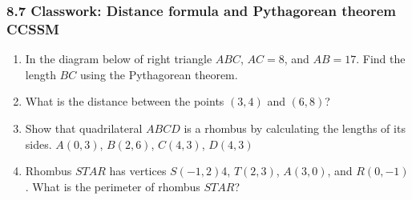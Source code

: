 

\fancyhead[LE]{\thepage}



\subsubsection*{8.7 Classwork: Distance formula and Pythagorean theorem \hfill CCSSM}
\begin{enumerate}
\item In the diagram below of right triangle $ABC$, $AC=8$, and $AB=17$. Find the length $BC$ using the Pythagorean theorem.
\begin{flushright}
\end{flushright}

\item What is the distance between the points $(3,4)$ and $(6,8)$? \vspace{4cm}

\item Show that quadrilateral $ABCD$ is a rhombus by calculating the lengths of its sides. $A(0,3)$, $B(2,6)$, $C(4,3)$, $D(4,3)$
\begin{flushright}
\end{flushright}

\newpage
\item Rhombus $STAR$ has vertices $S(-1,2)$4, $T(2,3)$, $A(3,0)$, and $R(0,-1)$. What is the perimeter of rhombus $STAR$? \vspace{7cm}


\end{enumerate}
